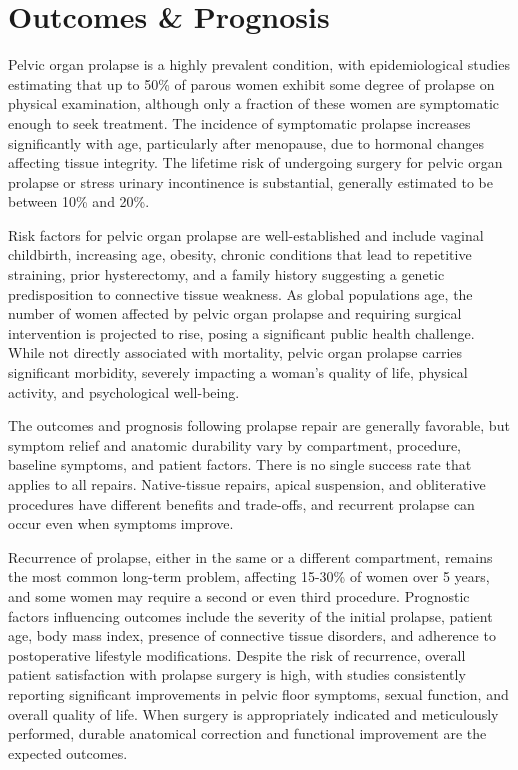 \section*{Outcomes \& Prognosis}
Pelvic organ prolapse is a highly prevalent condition, with epidemiological studies estimating that up to 50\% of parous women exhibit some degree of prolapse on physical examination, although only a fraction of these women are symptomatic enough to seek treatment. The incidence of symptomatic prolapse increases significantly with age, particularly after menopause, due to hormonal changes affecting tissue integrity. The lifetime risk of undergoing surgery for pelvic organ prolapse or stress urinary incontinence is substantial, generally estimated to be between 10\% and 20\%.

Risk factors for pelvic organ prolapse are well-established and include vaginal childbirth, increasing age, obesity, chronic conditions that lead to repetitive straining, prior hysterectomy, and a family history suggesting a genetic predisposition to connective tissue weakness. As global populations age, the number of women affected by pelvic organ prolapse and requiring surgical intervention is projected to rise, posing a significant public health challenge. While not directly associated with mortality, pelvic organ prolapse carries significant morbidity, severely impacting a woman's quality of life, physical activity, and psychological well-being.

The outcomes and prognosis following prolapse repair are generally favorable, but symptom relief and anatomic durability vary by compartment, procedure, baseline symptoms, and patient factors. There is no single success rate that applies to all repairs. Native-tissue repairs, apical suspension, and obliterative procedures have different benefits and trade-offs, and recurrent prolapse can occur even when symptoms improve.

Recurrence of prolapse, either in the same or a different compartment, remains the most common long-term problem, affecting 15-30\% of women over 5 years, and some women may require a second or even third procedure. Prognostic factors influencing outcomes include the severity of the initial prolapse, patient age, body mass index, presence of connective tissue disorders, and adherence to postoperative lifestyle modifications. Despite the risk of recurrence, overall patient satisfaction with prolapse surgery is high, with studies consistently reporting significant improvements in pelvic floor symptoms, sexual function, and overall quality of life. When surgery is appropriately indicated and meticulously performed, durable anatomical correction and functional improvement are the expected outcomes.

